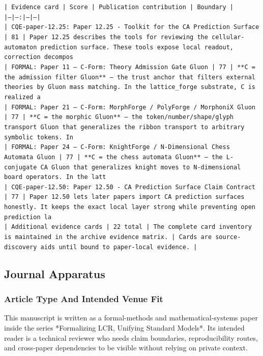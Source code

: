 \documentclass[11pt]{article}
\begin{document}
\noindent\texttt{| Evidence card | Score | Publication contribution | Boundary |}\\
\noindent\texttt{|---|---:|---|---|}\\
\noindent\texttt{| CQE-paper-12.25: Paper 12.25 - Toolkit for the CA Prediction Surface | 81 | Paper 12.25 describes the tools for reviewing the cellular-automaton prediction surface. These tools expose local readout, correction decompos}\\
\noindent\texttt{| FORMAL: Paper 11 — C-Form: Theory Admission Gate Gluon | 77 | **C = the admission filter Gluon** — the trust anchor that filters external theories by Gluon mass matching. In the lattice\_forge substrate, C is realized a}\\
\noindent\texttt{| FORMAL: Paper 21 — C-Form: MorphForge / PolyForge / MorphoniX Gluon | 77 | **C = the morphic Gluon** — the token/number/shape/glyph transport Gluon that generalizes the ribbon transport to arbitrary symbolic tokens. In}\\
\noindent\texttt{| FORMAL: Paper 24 — C-Form: KnightForge / N-Dimensional Chess Automata Gluon | 77 | **C = the chess automata Gluon** — the L-conjugate CA Gluon that generalizes knight moves to N-dimensional board operators. In the latt}\\
\noindent\texttt{| CQE-paper-12.50: Paper 12.50 - CA Prediction Surface Claim Contract | 77 | Paper 12.50 lets later papers import CA prediction surfaces honestly. It keeps the exact local layer strong while preventing open prediction la}\\
\noindent\texttt{| Additional evidence cards | 22 total | The complete card inventory is maintained in the archive evidence matrix. | Cards are source-discovery aids until bound to paper-local evidence. |}\\

\subsection*{Journal Apparatus}

\subsubsection*{Article Type And Intended Venue Fit}

This manuscript is written as a formal-methods and mathematical-systems paper
inside the series *Formalizing LCR, Unifying Standard Models*. Its intended
reader is a technical reviewer who needs claim boundaries, reproducibility
routes, and cross-paper dependencies to be visible without relying on private
context.
\end{document}
